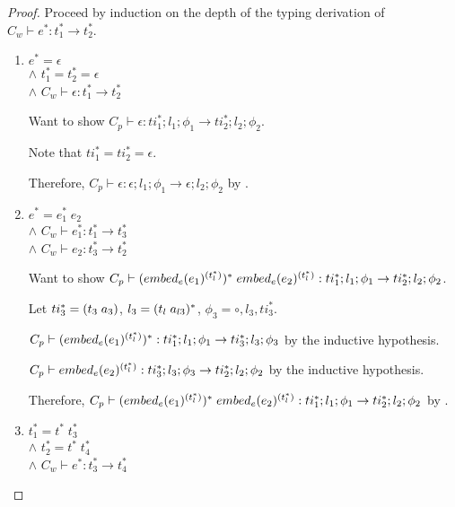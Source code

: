 \begin{proof}

    Proceed by induction on the depth of the typing derivation of $C_w \vdash e^{*} : t_1^{*} \rightarrow t_2^{*}$.

    \begin{enumerate}
        \item $e^{*} = \epsilon$
        \\ $\land$ $t_1^{*} = t_2^{*} = \epsilon$
        \\ $\land$ $C_w \vdash \epsilon : t_1^{*} \rightarrow t_2^{*}$

        Want to show $C_p \vdash \epsilon : ti_1^{*};l_1;\phi_1 \rightarrow ti_2^{*};l_2;\phi_2$.

        Note that $ti_1^{*} = ti_2^{*} = \epsilon$.

        Therefore, $C_p \vdash \epsilon : \epsilon;l_1;\phi_1 \rightarrow \epsilon;l_2;\phi_2$ by .

        \item $e^{*} = e_1^{*}\; e_2$
        \\ $\land$ $C_w \vdash e_1^{*} : t_1^{*} \rightarrow t_3^{*}$
        \\ $\land$ $C_w \vdash e_2 : t_3^{*} \rightarrow t_2^{*}$

        Want to show $C_p \vdash (\embed[e]{e_1}^{(t_l^{*})})^{*}\; \embed[e]{e_2}^{(t_l^{*})} : ti_1^{*};l_1;\phi_1 \rightarrow ti_2^{*};l_2;\phi_2$.

        Let $ti_3^{*} = \ti{t_3}{a_3}$, $l_3 = \ti{t_l}{a_{l3}}^{*}$, $\phi_3 = \circ,l_3,ti_3^{*}$.

        $C_p \vdash (\embed[e]{e_1}^{(t_l^{*})})^{*} : ti_1^{*};l_1;\phi_1 \rightarrow ti_3^{*};l_3;\phi_3$ by the inductive hypothesis.

        $C_p \vdash \embed[e]{e_2}^{(t_l^{*})} : ti_3^{*};l_3;\phi_3 \rightarrow ti_2^{*};l_2;\phi_2$ by the inductive hypothesis.

        Therefore, $C_p \vdash (\embed[e]{e_1}^{(t_l^{*})})^{*}\; \embed[e]{e_2}^{(t_l^{*})} : ti_1^{*};l_1;\phi_1 \rightarrow ti_2^{*};l_2;\phi_2$ by .

        \item $t_1^{*} = t^{*}\; t_3^{*}$
        \\ $\land$ $t_2^{*} = t^{*}\; t_4^{*}$
        \\ $\land$ $C_w \vdash e^{*} : t_3^{*} \rightarrow t_4^{*}$


\end{enumerate}
\end{proof}
